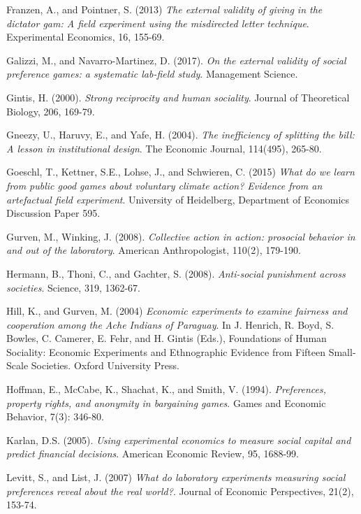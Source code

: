 \documentclass{article}
\begin{document}
\begin{thebibliography}{9}
Franzen, A., and Pointner, S. (2013)
\textit{The external validity of giving in the dictator gam: A field experiment using the misdirected letter technique}.
Experimental Economics, 16, 155-69.

Galizzi, M., and Navarro-Martinez, D. (2017).
\textit{On the external validity of social preference games: a systematic lab-field study}.
Management Science.

Gintis, H. (2000).
\textit{Strong reciprocity and human sociality}.
Journal of Theoretical Biology, 206, 169-79.

Gneezy, U., Haruvy, E., and Yafe, H. (2004).
\textit{The inefficiency of splitting the bill: A lesson in institutional design}.
The Economic Journal, 114(495), 265-80.

Goeschl, T., Kettner, S.E., Lohse, J., and Schwieren, C. (2015)
\textit{What do we learn from public good games about voluntary climate action? Evidence from an artefactual field experiment}.
University of Heidelberg, Department of Economics Discussion Paper 595.

Gurven, M., Winking, J. (2008).
\textit{Collective action in action: prosocial behavior in and out of the laboratory}.
American Anthropologist, 110(2), 179-190. 

Hermann, B., Thoni, C., and Gachter, S. (2008).
\textit{Anti-social punishment across societies}.
Science, 319, 1362-67.

Hill, K., and Gurven, M. (2004)
\textit{Economic experiments to examine fairness and cooperation among the Ache Indians of Paraguay}.
In J. Henrich, R. Boyd, S. Bowles, C. Camerer, E. Fehr, and H. Gintis (Eds.),
Foundations of Human Sociality: Economic Experiments and Ethnographic Evidence from Fifteen Small-Scale Societies. Oxford University Press.

Hoffman, E., McCabe, K., Shachat, K., and Smith, V. (1994).
\textit{Preferences, property rights, and anonymity in bargaining games}.
Games and Economic Behavior, 7(3): 346-80.

Karlan, D.S. (2005).
\textit{Using experimental economics to measure social capital and predict financial decisions}.
American Economic Review, 95, 1688-99.

Levitt, S., and List, J. (2007)
\textit{What do laboratory experiments measuring social preferences reveal about the real world?}.
Journal of Economic Perspectives, 21(2), 153-74.



\end{thebibliography}
\end{document}
